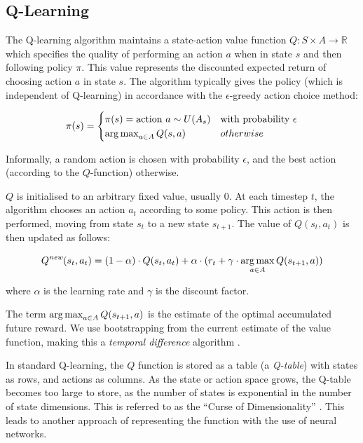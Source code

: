 

\subsection{Q-Learning}
The Q-learning algorithm maintains a state-action value function $Q : S \times A \to \mathbb{R}$ which specifies the quality of performing an action $a$ when in state $s$ and then following policy $\pi$. This value represents the discounted expected return of choosing action $a$ in state $s$. The algorithm typically gives the policy (which is independent of Q-learning) in accordance with the $\epsilon$-greedy action choice method:


\[ \pi(s) = \begin{cases} 
      \pi(s) = \text{action } a \sim U(A_s) & \text{with probability $\epsilon$} \\
      \operatorname*{arg\,max}_{a \in A}Q(s,a) & otherwise                         
   \end{cases}
\]

Informally, a random action is chosen with probability $\epsilon$, and the best action (according to the $Q$-function) otherwise.

$Q$ is initialised to an arbitrary fixed value, usually $0$. At each timestep $t$, the algorithm chooses an action $a_t$ according to some policy. This action is then performed, moving from state $s_t$ to a new state $s_{t+1}$. The value of $Q(s_t,a_t)$ is then updated as follows:

\[Q^{\textit{new}}(s_t,a_t) = (1-\alpha) \cdot Q(s_t,a_t) + \alpha \cdot (r_t + \gamma \cdot \operatorname*{arg\,max}_{a \in A}Q(s_{t+1},a))\]

where $\alpha$ is the learning rate and $\gamma$ is the discount factor.

The term $\operatorname*{arg\,max}_{a \in A}Q(s_{t+1},a)$ is the estimate of the optimal accumulated future reward. We use bootstrapping from the current estimate of the value function, making this a \textit{temporal difference} algorithm \cite{RLAnIntro}.

In standard Q-learning, the $Q$ function is stored as a table (a \textit{Q-table}) with states as rows, and actions as columns. As the state or action space grows, the Q-table becomes too large to store, as the number of states is exponential in the number of state dimensions. This is referred to as the ``Curse of Dimensionality'' \cite{cod}. This leads to another approach of representing the function with the use of neural networks.


